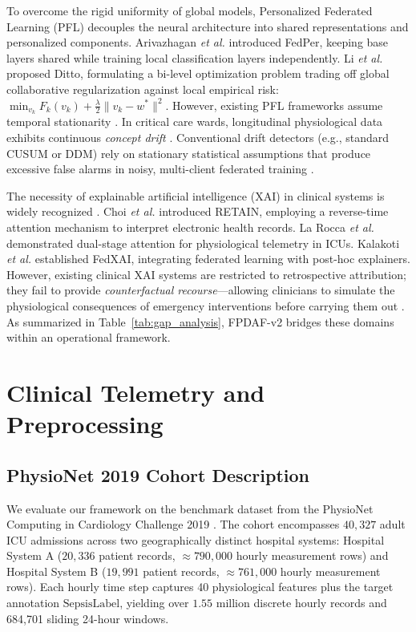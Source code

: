 \documentclass[10pt,a4paper,twocolumn,twoside]{article}
\begin{document}
To overcome the rigid uniformity of global models, Personalized Federated Learning (PFL) decouples the neural architecture into shared representations and personalized components. Arivazhagan \textit{et al.} \cite{arivazhagan2020} introduced FedPer, keeping base layers shared while training local classification layers independently. Li \textit{et al.} \cite{li2021ditto} proposed Ditto, formulating a bi-level optimization problem trading off global collaborative regularization against local empirical risk: $\min_{v_k} F_k(v_k) + \frac{\lambda}{2} \|v_k - w^*\|^2$. However, existing PFL frameworks assume temporal stationarity \cite{wang2025personalized,yuan2024trend}. In critical care wards, longitudinal physiological data exhibits continuous \textit{concept drift} \cite{jothimurugesan2022,bernardi2023adaptive}. Conventional drift detectors (e.g., standard CUSUM or DDM) rely on stationary statistical assumptions that produce excessive false alarms in noisy, multi-client federated training \cite{bernardi2023adaptive}.

The necessity of explainable artificial intelligence (XAI) in clinical systems is widely recognized \cite{lundberg2018explainable,sundararajan2017axiomatic}. Choi \textit{et al.} \cite{choi2016retain} introduced RETAIN, employing a reverse-time attention mechanism to interpret electronic health records. La Rocca \textit{et al.} \cite{larocca2021attention} demonstrated dual-stage attention for physiological telemetry in ICUs. Kalakoti \textit{et al.} \cite{kalakoti2025fedxai} established FedXAI, integrating federated learning with post-hoc explainers. However, existing clinical XAI systems are restricted to retrospective attribution; they fail to provide \textit{counterfactual recourse}---allowing clinicians to simulate the physiological consequences of emergency interventions before carrying them out \cite{larocca2022shap}. As summarized in Table~\ref{tab:gap_analysis}, FPDAF-v2 bridges these domains within an operational framework.

\section{Clinical Telemetry and Preprocessing}
\subsection{PhysioNet 2019 Cohort Description}
We evaluate our framework on the benchmark dataset from the PhysioNet Computing in Cardiology Challenge 2019 \cite{reyna2020physionet}. The cohort encompasses $40,327$ adult ICU admissions across two geographically distinct hospital systems: Hospital System A ($20,336$ patient records, $\approx 790,000$ hourly measurement rows) and Hospital System B ($19,991$ patient records, $\approx 761,000$ hourly measurement rows). Each hourly time step captures 40 physiological features plus the target annotation $\text{SepsisLabel}$, yielding over $1.55$ million discrete hourly records and 684,701 sliding 24-hour windows.
\end{document}
